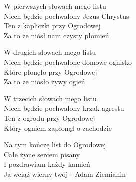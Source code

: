 \begin{text}
    W pierwszych słowach mego listu\\
    Niech będzie pochwalony Jezus Chrystus\\
    Ten z kapliczki przy Ogrodowej\\
    Za to że niósł nam czysty płomień

    W drugich słowach mego listu\\
    Niech będzie pochwalone domowe ognisko\\
    Które płonęło przy Ogrodowej\\
    Za to że niosło żywy ogień

    W trzecich słowach mego listu\\
    Niech będzie pochwalony krzak agrestu\\
    Ten z ogrodu przy Ogrodowej\\
    Który ogniem zapłonął o zachodzie

    Na tym kończę list do Ogrodowej\\
    Całe życie sercem pisany\\
    I pozdrawiam każdy kamień\\
    Ja wciąż wierny twój - Adam Ziemianin
\end{text}
\begin{chord}

\end{chord}